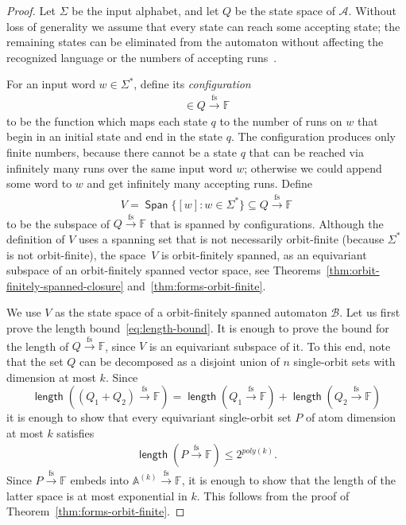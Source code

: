 \documentclass[10pt,a4paper]{amsart}
\numberwithin{equation}{section}
\newcommand{\set}[1]{\{#1\}}
\newcommand{\Aa}{{\mathcal A}}
\newcommand{\Bb}{{\mathcal B}}
\newcommand{\atoms}{\mathbb A}
\DeclareMathOperator{\spanvec}{\mathsf{Span}}
\DeclareMathOperator{\length}{\mathsf{length}}
\newcommand{\field}{\mathbb F}
\newcommand{\finsup}{\stackrel{\mathrm{fs}}{\to}}
\newcommand{\forms}[1]{#1 \finsup \field}
\newcommand{\formscrammed}[1]{#1 \! \finsup \! \field}
\begin{document}
\begin{proof}
    Let $\Sigma$ be the input alphabet, and let $Q$ be the state space of $\Aa$.  Without loss of generality we assume that every state can reach some accepting state; the remaining states can be eliminated from the automaton without affecting  the recognized language or the numbers of accepting runs~\cite[Cor.~9.12]{bojanczyk_slightly2018}.
    

    For an input word $w \in \Sigma^*$, define its \emph{configuration} 
    \begin{align*}
    [w] \in \forms Q
    \end{align*}
    to be the function which maps each state $q$ to the number of runs on $w$ that begin in an initial state and end in the state $q$. The configuration produces only finite numbers, because  there cannot be a  state $q$ that can be reached via infinitely many runs over the same input word $w$; otherwise we could append some word to $w$ and get infinitely many accepting runs.
    Define 
    \begin{align*}
     V = \spanvec \set{[w] : w \in \Sigma^*} \subseteq \forms Q
    \end{align*}
    to be the subspace of $\forms Q$ that is spanned by configurations. Although the definition of $V$ uses a spanning set that is not necessarily orbit-finite (because $\Sigma^*$ is not orbit-finite), the space~$V$ is orbit-finitely spanned, as an equivariant subspace of an orbit-finitely spanned vector space, see Theorems~\ref{thm:orbit-finitely-spanned-closure} and~\ref{thm:forms-orbit-finite}.  

    We use $V$ as the state space of a orbit-finitely spanned automaton $\Bb$. Let us first prove the length bound~\eqref{eq:length-bound}. It is enough to prove the bound for the length of $\forms Q$, since $V$ is an equivariant subspace of it.
  To this end, note that the set $Q$ can be decomposed as a disjoint union of $n$ single-orbit sets with dimension at most $k$. Since 
        \[
        \length( \formscrammed {(Q_1 \! + \! Q_2)}) =
        \length(\formscrammed {Q_1}) + \length(\formscrammed {Q_2})
        \]
        it is enough to show that every equivariant single-orbit set $P$ of atom dimension at most $k$ satisfies 
        \begin{align*}
        \length ( \forms P) \le 2^{poly(k)}.
        \end{align*}
        Since $\forms P$ embeds into $\forms {\atoms^{(k)}}$, it is enough to show that the length of the latter space is at most exponential in $k$.  This follows from the proof of Theorem~\ref{thm:forms-orbit-finite}.


\end{proof}
\end{document}
